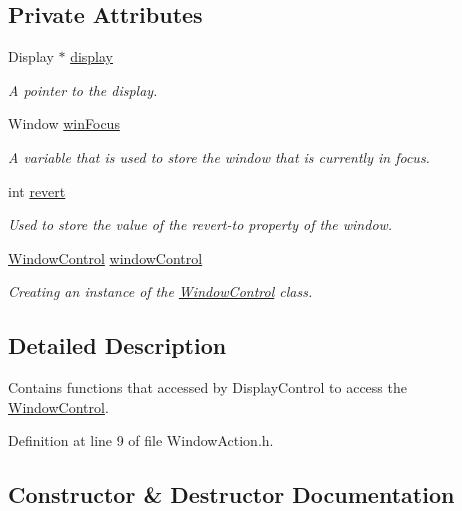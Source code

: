 \subsection*{Private Attributes}
\begin{DoxyCompactItemize}
\item 
Display $\ast$ \hyperlink{class_ubuntu_controller_1_1_window_action_a48d88d865a625a45df6f48d20ab62066}{display}
\begin{DoxyCompactList}\small\item\em A pointer to the display. \end{DoxyCompactList}\item 
Window \hyperlink{class_ubuntu_controller_1_1_window_action_aca24fda49c815b7362c21a00b8e26607}{win\+Focus}
\begin{DoxyCompactList}\small\item\em A variable that is used to store the window that is currently in focus. \end{DoxyCompactList}\item 
int \hyperlink{class_ubuntu_controller_1_1_window_action_a1aa60345251fef9fa34a1960ac0cec0e}{revert}
\begin{DoxyCompactList}\small\item\em Used to store the value of the revert-\/to property of the window. \end{DoxyCompactList}\item 
\hyperlink{class_ubuntu_controller_1_1_window_control}{Window\+Control} \hyperlink{class_ubuntu_controller_1_1_window_action_ac12718a724eb4d653f53dc35493461ed}{window\+Control}
\begin{DoxyCompactList}\small\item\em Creating an instance of the \hyperlink{class_ubuntu_controller_1_1_window_control}{Window\+Control} class. \end{DoxyCompactList}\end{DoxyCompactItemize}


\subsection{Detailed Description}
Contains functions that accessed by Display\+Control to access the \hyperlink{class_ubuntu_controller_1_1_window_control}{Window\+Control}. 

Definition at line 9 of file Window\+Action.\+h.



\subsection{Constructor \& Destructor Documentation}
\mbox{\label{class_ubuntu_controller_1_1_window_action_a1836cf300ad545fa88f33454d09765e1}} 
